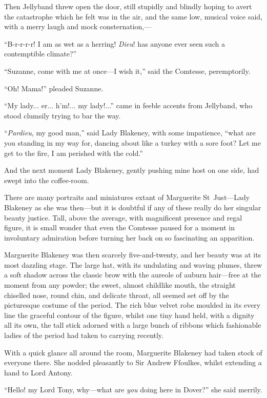 Then Jellyband threw open the door, still stupidly and blindly hoping to avert the catastrophe which he felt was in the air, and the same low, musical voice said, with a merry laugh and mock consternation,---

\enquote{B-r-r-r-r! I am as wet as a herring! \textit{Dieu}! has anyone ever seen such a contemptible climate?}

\enquote{Suzanne, come with me at once---I wish it,} said the Comtesse, peremptorily.

\enquote{Oh! Mama!} pleaded Suzanne.

\enquote{My lady... er... h'm!... my lady!...} came in feeble accents from Jellyband, who stood clumsily trying to bar the way.

\enquote{\textit{Pardieu}, my good man,} said Lady Blakeney, with some impatience, \enquote{what are you standing in my way for, dancing about like a turkey with a sore foot? Let me get to the fire, I am perished with the cold.}

And the next moment Lady Blakeney, gently pushing mine host on one side, had swept into the coffee-room.

There are many portraits and miniatures extant of Marguerite St~Just---Lady Blakeney as she was then---but it is doubtful if any of these really do her singular beauty justice. Tall, above the average, with magnificent presence and regal figure, it is small wonder that even the Comtesse paused for a moment in involuntary admiration before turning her back on so fascinating an apparition.

Marguerite Blakeney was then scarcely five-and-twenty, and her beauty was at its most dazzling stage. The large hat, with its undulating and waving plumes, threw a soft shadow across the classic brow with the aureole of auburn hair---free at the moment from any powder; the sweet, almost childlike mouth, the straight chiselled nose, round chin, and delicate throat, all seemed set off by the picturesque costume of the period. The rich blue velvet robe moulded in its every line the graceful contour of the figure, whilst one tiny hand held, with a dignity all its own, the tall stick adorned with a large bunch of ribbons which fashionable ladies of the period had taken to carrying recently.

With a quick glance all around the room, Marguerite Blakeney had taken stock of everyone there. She nodded pleasantly to Sir Andrew Ffoulkes, whilst extending a hand to Lord Antony.

\enquote{Hello! my Lord Tony, why---what are \textit{you} doing here in Dover?} she said merrily.

